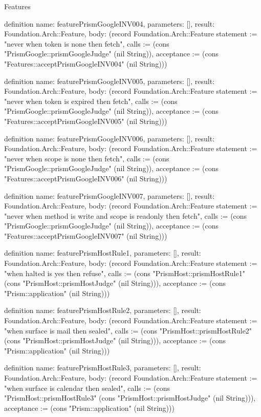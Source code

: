 \begin{lexlean}{Features}
\begin{semanticmodule}
definition{
  name: featurePrismGoogleINV004,
  parameters: [],
  result: Foundation.Arch::Feature,
  body: (record Foundation.Arch::Feature {statement := "never when token is none then fetch", calls := (cons "PrismGoogle::prismGoogleJudge" (nil String)), acceptance := (cons "Features::acceptPrismGoogleINV004" (nil String))})
}

definition{
  name: featurePrismGoogleINV005,
  parameters: [],
  result: Foundation.Arch::Feature,
  body: (record Foundation.Arch::Feature {statement := "never when token is expired then fetch", calls := (cons "PrismGoogle::prismGoogleJudge" (nil String)), acceptance := (cons "Features::acceptPrismGoogleINV005" (nil String))})
}

definition{
  name: featurePrismGoogleINV006,
  parameters: [],
  result: Foundation.Arch::Feature,
  body: (record Foundation.Arch::Feature {statement := "never when scope is none then fetch", calls := (cons "PrismGoogle::prismGoogleJudge" (nil String)), acceptance := (cons "Features::acceptPrismGoogleINV006" (nil String))})
}

definition{
  name: featurePrismGoogleINV007,
  parameters: [],
  result: Foundation.Arch::Feature,
  body: (record Foundation.Arch::Feature {statement := "never when method is write and scope is readonly then fetch", calls := (cons "PrismGoogle::prismGoogleJudge" (nil String)), acceptance := (cons "Features::acceptPrismGoogleINV007" (nil String))})
}

definition{
  name: featurePrismHostRule1,
  parameters: [],
  result: Foundation.Arch::Feature,
  body: (record Foundation.Arch::Feature {statement := "when halted is yes then refuse", calls := (cons "PrismHost::prismHostRule1" (cons "PrismHost::prismHostJudge" (nil String))), acceptance := (cons "Prism::application" (nil String))})
}

definition{
  name: featurePrismHostRule2,
  parameters: [],
  result: Foundation.Arch::Feature,
  body: (record Foundation.Arch::Feature {statement := "when surface is mail then sealed", calls := (cons "PrismHost::prismHostRule2" (cons "PrismHost::prismHostJudge" (nil String))), acceptance := (cons "Prism::application" (nil String))})
}

definition{
  name: featurePrismHostRule3,
  parameters: [],
  result: Foundation.Arch::Feature,
  body: (record Foundation.Arch::Feature {statement := "when surface is calendar then sealed", calls := (cons "PrismHost::prismHostRule3" (cons "PrismHost::prismHostJudge" (nil String))), acceptance := (cons "Prism::application" (nil String))})
}


\end{semanticmodule}
\end{lexlean}
